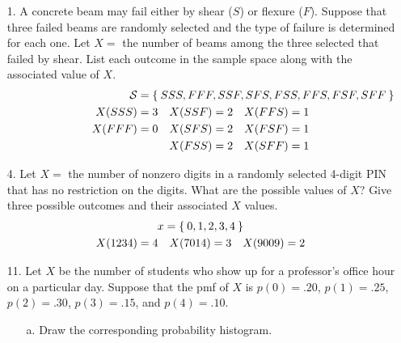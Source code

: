 \documentclass[letterpaper,12pt]{article}
\newcommand{\equationinalign}[2]{%
  \multispan{#2}%
  \hfill$\displaystyle{#1}$\hfill
  \ignorespaces
}
\begin{document}
\maketitle

\begin{enumerate}
  \item[1.]
    A concrete beam may fail either by shear ($S$) or flexure ($F$). Suppose that three failed beams are randomly selected and the type of failure is determined for each one. Let $X =$ the number of beams among the three selected that failed by shear. List each outcome in the sample space along with the associated value of $X$.
    \begin{align*}
      \mathcal{S} &= \mathrlap{\Set{SSS, FFF, SSF, SFS, FSS, FFS, FSF, SFF}} & & & & \\
      X(SSS) &= 3 & X(SSF) &= 2 & X(FFS) &= 1 \\
      X(FFF) &= 0 & X(SFS) &= 2 & X(FSF) &= 1 \\
                & & X(FSS) &= 2 & X(SFF) &= 1
    \end{align*}
  \item[4.]
    Let $X =$ the number of nonzero digits in a randomly selected 4-digit PIN that has no restriction on the digits. What are the possible values of $X$? Give three possible outcomes and their associated $X$ values.
    \begin{align*}
      \equationinalign{x = \Set{0, 1, 2, 3, 4}}{6} \\
      X(1234) &= 4 & X(7014) &= 3 & X(9009) &= 2
    \end{align*}
  \item[11.]
    Let $X$ be the number of students who show up for a professor’s office hour on a particular day. Suppose that the pmf of $X$ is $p(0) = .20$, $p(1) = .25$, $p(2) = .30$, $p(3) = .15$, and $p(4) = .10$.
    \begin{enumerate}
      \item[a.]
        Draw the corresponding probability histogram.
        \begin{center}
\end{center}
\end{enumerate}
\end{enumerate}
\end{document}
